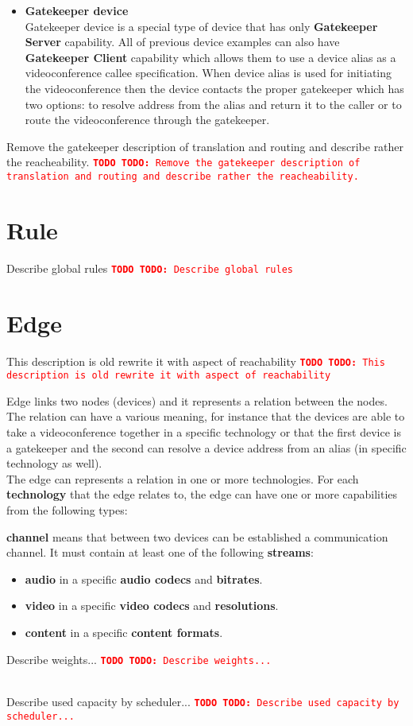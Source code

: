 \documentclass[a4paper]{report}
\newcommand{\TODO}[1]{%
\def\empty{}%
\def\prvniparametr{#1}%
\ifx\prvniparametr\empty%
\begingroup\tt\textcolor{red}{\noindent\textbf{TODO}}\endgroup
\else%
\begingroup\tt\textcolor{red}{\noindent\textbf{TODO:}\ #1}\endgroup
\fi%
}
\begin{document}
\begin{itemize}
\item \textbf{Gatekeeper device} \\
  Gatekeeper device is a special type of device that has only 
  \textbf{Gatekeeper Server} capability. All of previous device examples can 
  also have \textbf{Gatekeeper Client} capability which allows them to use a 
  device alias as a videoconference callee specification. When device alias is 
  used for initiating the videoconference then the device contacts the proper 
  gatekeeper which has two options: to resolve address from the alias and 
  return it to the caller or to route the videoconference through the 
  gatekeeper.
\end{itemize}

\TODO{Remove the gatekeeper description of translation and routing and describe rather the reacheability.}

\section{Rule}
\TODO{Describe global rules}
 

\section{Edge}

\TODO{This description is old rewrite it with aspect of reachability}

Edge links two nodes (devices) and it represents a relation between the 
nodes. The relation can have a various meaning, for instance that the devices
are able to take a videoconference together in a specific technology or
that the first device is a gatekeeper and the second can resolve a device 
address from an alias (in specific technology as well).
\\
The edge can represents a relation in one or more technologies. For each \textbf{technology} that the edge relates to, the edge can have one or more 
capabilities from the following types:
\begin{compactitem}   
\item \textbf{channel} means that between two devices can be established
  a communication channel. It must contain at least one of the following 
  \textbf{streams}:
  \begin{itemize}
    \item \textbf{audio} in a specific \textbf{audio codecs} and 
      \textbf{bitrates}.
    \item \textbf{video} in a specific \textbf{video codecs} and 
      \textbf{resolutions}.
    \item \textbf{content} in a specific \textbf{content formats}.
  \end{itemize} 
  
\item \TODO{Describe weights...}
   \\ \TODO{Describe used capacity by scheduler...}
\end{compactitem}   
  
\end{document}
